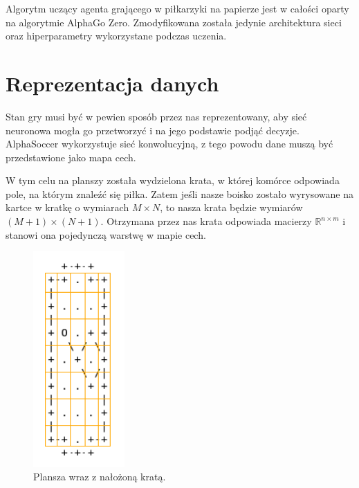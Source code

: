 \documentclass[licencjacka]{pracamgr}
\begin{document}
Algorytm uczący agenta grającego w piłkarzyki na papierze jest w całości oparty na algorytmie AlphaGo Zero. Zmodyfikowana została jedynie architektura sieci oraz hiperparametry wykorzystane podczas uczenia.


\section{Reprezentacja danych}

Stan gry musi być w pewien sposób przez nas reprezentowany, aby sieć neuronowa mogła go przetworzyć i na jego podstawie podjąć decyzje. AlphaSoccer wykorzystuje sieć konwolucyjną, z tego powodu dane muszą być przedstawione jako mapa cech. 

W tym celu na planszy została wydzielona krata, w której komórce odpowiada pole, na którym znaleźć się piłka. Zatem jeśli nasze boisko zostało wyrysowane na kartce w kratkę o wymiarach $M \times N$, to nasza krata będzie wymiarów $(M + 1) \times (N + 1)$. Otrzymana przez nas krata odpowiada macierzy $\mathbb{R}^{n \times m}$ i stanowi ona pojedynczą warstwę w mapie cech. 

\begin{figure}[ht!]
  \centering
  \includegraphics[width=35mm]{feature_map_grid}
  \caption{Plansza wraz z nałożoną kratą.}
\end{figure}
\end{document}
